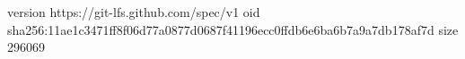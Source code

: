 version https://git-lfs.github.com/spec/v1
oid sha256:11ae1c3471ff8f06d77a0877d0687f41196ecc0ffdb6e6ba6b7a9a7db178af7d
size 296069
